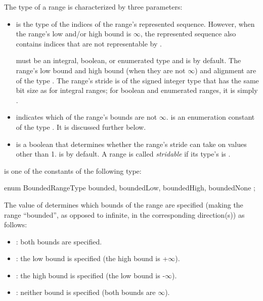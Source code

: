 The type of a range is characterized by three parameters:
\begin{itemize}

\item {} is the type of the indices of the range's
  represented sequence. However, when the range's low and/or high
  bound is $\infty$, the represented sequence also contains indices
  that are not representable by .

   must be an integral, boolean, or enumerated type and is  by default.
%
  The range's low bound and high bound (when they are not $\infty$)
  and alignment are of the type . The range's stride
  is of the signed integer type that has the same bit size as 
  for integral ranges; for boolean and enumerated ranges, it is simply .

\item {} indicates which of the range's bounds are not $\infty$.
   is an enumeration constant of the type
  . It is discussed further below.

\item {} is a boolean that determines whether the range's stride
  can take on values other than 1.
   is  by default.
  A range is called \emph{stridable}
  if its type's  is .

\end{itemize}

 is one of the constants of the following type:

\begin{chapel}
enum BoundedRangeType { bounded, boundedLow, boundedHigh, boundedNone };
\end{chapel}

The value of  determines which bounds of the range
are specified (making the range ``bounded'', as opposed to infinite,
in the corresponding direction(s))
as follows:

\begin{itemize}

\item {}:
  both bounds are specified.

\item {}:
  the low bound is specified (the high bound is +$\infty$).

\item {}:
  the high bound is specified (the low bound is -$\infty$).

\item {}:
  neither bound is specified (both bounds are $\infty$).

\end{itemize}

